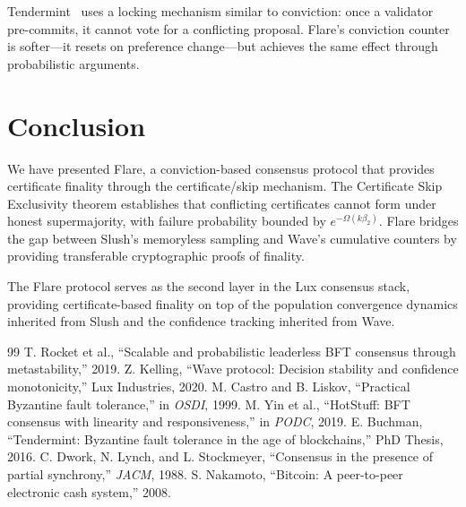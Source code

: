 \documentclass[11pt,a4paper]{article}
\begin{document}
Tendermint~\cite{buchman2016tendermint} uses a locking mechanism similar to conviction:
once a validator pre-commits, it cannot vote for a conflicting proposal. Flare's conviction
counter is softer---it resets on preference change---but achieves the same effect through
probabilistic arguments.

\section{Conclusion}
\label{sec:conclusion}

We have presented Flare, a conviction-based consensus protocol that provides certificate
finality through the certificate/skip mechanism. The Certificate Skip Exclusivity theorem
establishes that conflicting certificates cannot form under honest supermajority, with
failure probability bounded by $e^{-\Omega(k\beta_2)}$. Flare bridges the gap between
Slush's memoryless sampling and Wave's cumulative counters by providing transferable
cryptographic proofs of finality.

The Flare protocol serves as the second layer in the Lux consensus stack, providing
certificate-based finality on top of the population convergence dynamics inherited from
Slush and the confidence tracking inherited from Wave.

\begin{thebibliography}{99}
 T. Rocket et al., ``Scalable and probabilistic leaderless BFT consensus through metastability,'' 2019.
 Z. Kelling, ``Wave protocol: Decision stability and confidence monotonicity,'' Lux Industries, 2020.
 M. Castro and B. Liskov, ``Practical Byzantine fault tolerance,'' in \emph{OSDI}, 1999.
 M. Yin et al., ``HotStuff: BFT consensus with linearity and responsiveness,'' in \emph{PODC}, 2019.
 E. Buchman, ``Tendermint: Byzantine fault tolerance in the age of blockchains,'' PhD Thesis, 2016.
 C. Dwork, N. Lynch, and L. Stockmeyer, ``Consensus in the presence of partial synchrony,'' \emph{JACM}, 1988.
 S. Nakamoto, ``Bitcoin: A peer-to-peer electronic cash system,'' 2008.
\end{thebibliography}
\end{document}
